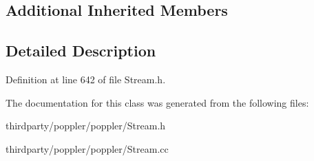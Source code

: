 \subsection*{Additional Inherited Members}


\subsection{Detailed Description}


Definition at line 642 of file Stream.\+h.



The documentation for this class was generated from the following files\+:\begin{DoxyCompactItemize}
\item 
thirdparty/poppler/poppler/Stream.\+h\item 
thirdparty/poppler/poppler/Stream.\+cc\end{DoxyCompactItemize}
